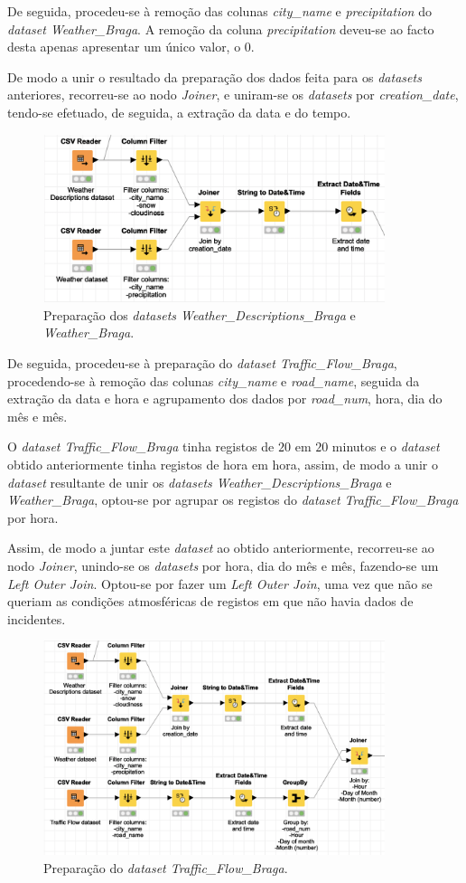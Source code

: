 \documentclass[a4paper, 12pt]{article}
\begin{document}
De seguida, procedeu-se à remoção das colunas \textit{city\_name} e \textit{precipitation} do \textit{dataset Weather\_Braga}. A remoção da coluna \textit{precipitation} deveu-se ao facto desta apenas apresentar um único valor, o $0$. 

De modo a unir o resultado da preparação dos dados feita para os \textit{datasets} anteriores, recorreu-se ao nodo \textit{Joiner}, e uniram-se os \textit{datasets} por \textit{creation\_date}, tendo-se efetuado, de seguida, a extração da data e do tempo.

\begin{figure}[H]
	\centering
	\includegraphics[width=10cm]{weather}
	\caption{Preparação dos \textit{datasets Weather\_Descriptions\_Braga} e \textit{Weather\_Braga}.}
\end{figure}

De seguida, procedeu-se à preparação do \textit{dataset Traffic\_Flow\_Braga}, procedendo-se à remoção das colunas \textit{city\_name} e \textit{road\_name}, seguida da extração da data e hora e agrupamento dos dados por \textit{road\_num}, hora, dia do mês e mês. 

O \textit{dataset Traffic\_Flow\_Braga} tinha registos de $20$ em $20$ minutos e o \textit{dataset} obtido anteriormente tinha registos de hora em hora, assim, de modo a unir o \textit{dataset} resultante de unir os \textit{datasets Weather\_Descriptions\_Braga} e \textit{Weather\_Braga}, optou-se por agrupar os registos do \textit{dataset Traffic\_Flow\_Braga} por hora.

Assim, de modo a juntar este \textit{dataset} ao obtido anteriormente, recorreu-se ao nodo \textit{Joiner}, unindo-se os \textit{datasets} por hora, dia do mês e mês, fazendo-se um \textit{Left Outer Join}. Optou-se por fazer um \textit{Left Outer Join}, uma vez que não se queriam as condições atmosféricas de registos em que não havia dados de incidentes.

\begin{figure}[H]
	\centering
	\includegraphics[width=10cm]{join}
	\caption{Preparação do \textit{dataset Traffic\_Flow\_Braga}.}
\end{figure}
\end{document}
